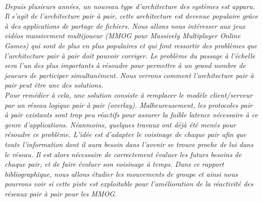 \\
	\par \textit{Depuis plusieurs années, un nouveau type d'architecture des systèmes est apparu. Il s'agit de l'architecture pair à pair, cette architecture est devenue populaire grâce à des applications de partage de fichiers. Nous allons nous intéresser aux jeux vidéos massivement multijoueur (MMOG pour Massively Multiplayer Online Games) qui sont de plus en plus populaires et qui font ressortir des problèmes que l'architecture pair à pair doit pouvoir corriger. Le problème du passage à l'échelle sera l'un des plus importants à résoudre pour permettre à un grand nombre de joueurs de participer simultanément. Nous verrons comment l'architecture pair à pair peut être une des solutions.\\ 
	 Pour remédier à cela, une solution consiste à remplacer le modèle client/serveur par un réseau logique pair à pair (overlay). Malheureusement, les protocoles pair à pair existants sont trop peu réactifs pour assurer la faible latence nécessaire à ce genre d’applications. Néanmoins, quelques travaux ont déjà été menés pour résoudre ce problème. L’idée est d’adapter le voisinage de chaque pair afin que toute l’information dont il aura besoin dans l'avenir se trouve proche de lui dans le réseau. Il est alors nécessaire de correctement évaluer les futurs besoins de chaque pair, et de faire évoluer son voisinage à temps. Dans ce rapport bibliographique, nous allons étudier les mouvements de groupe et ainsi nous pourrons voir si cette piste est exploitable pour l'amélioration de la réactivité des réseaux pair à pair pour les MMOG.}\\
